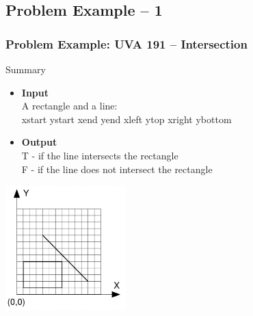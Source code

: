 \documentclass{beamer}
\begin{document}
\subsection{Problem Example -- 1}
\begin{frame}
  \frametitle{Problem Example: UVA 191 -- Intersection}

  {\small
    \begin{block}{Summary}
      \begin{itemize}
      \item {\bf Input}\\
        A rectangle and a line:\\
        xstart ystart xend yend xleft ytop xright ybottom
        
      \item {\bf Output}\\
        T - if the line intersects the rectangle\\
        F - if the line does not intersect the rectangle\\
      \end{itemize}
    \end{block}

    \includegraphics[width=0.35\textwidth]{img/intersection_uva}
    }
\end{frame}
\end{document}
